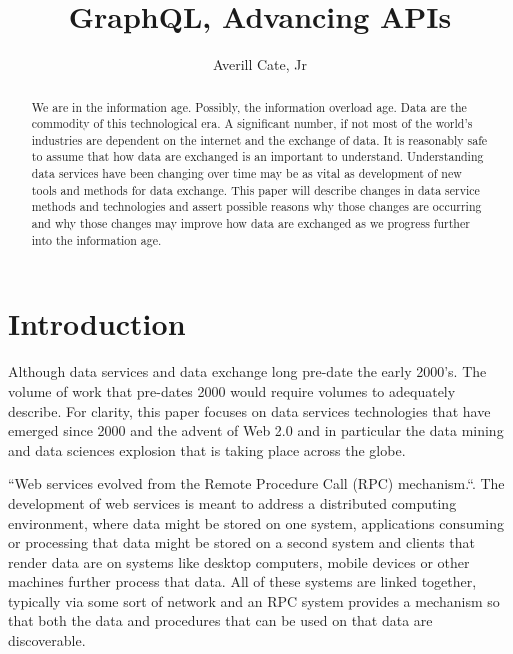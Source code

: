 
\title{GraphQL, Advancing APIs}

\author{Averill Cate, Jr}

\renewcommand{\shortauthors}{A. Cate, Jr}

\begin{abstract}
We are in the information age.  Possibly, the information overload age.
Data are the commodity of this technological era.  A significant number, if not
most of the world's industries are dependent on the internet and the exchange
of data.  It is reasonably safe to assume that how data are exchanged is
an important to understand.  Understanding data services have been changing
over time may be as vital as development of new tools and methods for data
exchange.  This paper will describe changes in data service methods and 
technologies and assert possible reasons why those changes are occurring and 
why those changes may improve how data are exchanged as we progress further 
into the information age.
\end{abstract}


\maketitle

\section{Introduction}
Although data services and data exchange long pre-date the early 2000's.  The
volume of work that pre-dates 2000 would require volumes to adequately describe.
For clarity, this paper focuses on data services technologies that have emerged
since 2000 and the advent of Web 2.0 and in particular the data mining and
data sciences explosion that is taking place across the globe.

``Web services evolved from the Remote Procedure Call (RPC) mechanism.``\cite{hid505Kalin2009}.  
The development of web services is meant to address a distributed computing 
environment, where data might be stored on one system, applications consuming 
or processing that data might be stored on a second system and clients that 
render data are on systems like desktop computers, mobile devices or other 
machines further process that data.  All of these systems are linked together, 
typically via some sort of network and an RPC system provides a mechanism so 
that both the data and procedures that can be used on that data are 
discoverable\cite{hid505Kalin2009}.

